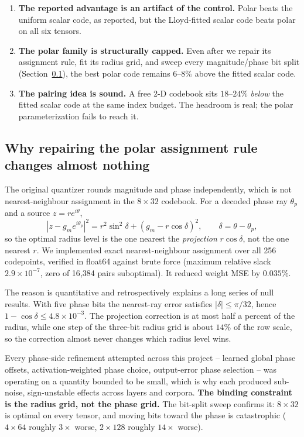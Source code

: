 \begin{enumerate}
\item \textbf{The reported advantage is an artifact of the control.} Polar beats
the uniform scalar code, as reported, but the Lloyd-fitted scalar code beats
polar on all six tensors.
\item \textbf{The polar family is structurally capped.} Even after we repair its
assignment rule, fit its radius grid, and sweep every magnitude/phase bit split
(Section~\ref{sec:polarfix}), the best polar code remains $6$--$8\%$ above the
fitted scalar code.
\item \textbf{The pairing idea is sound.} A free 2-D codebook sits $18$--$24\%$
\emph{below} the fitted scalar code at the same index budget. The headroom is
real; the polar parameterization fails to reach it.
\end{enumerate}

\subsection{Why repairing the polar assignment rule changes almost nothing}
\label{sec:polarfix}

The original quantizer rounds magnitude and phase independently, which is not
nearest-neighbour assignment in the $8\times32$ codebook. For a decoded phase
ray $\theta_p$ and a source $z=re^{i\theta}$,
\begin{equation}
 |z-g_m e^{i\theta_p}|^2 = r^2\sin^2\delta + (g_m - r\cos\delta)^2,
 \qquad \delta=\theta-\theta_p ,
\end{equation}
so the optimal radius level is the one nearest the \emph{projection}
$r\cos\delta$, not the one nearest $r$. We implemented exact nearest-neighbour
assignment over all 256 codepoints, verified in float64 against brute force
(maximum relative slack $2.9\times10^{-7}$, zero of 16{,}384 pairs suboptimal).
It reduced weight MSE by $0.035\%$.

The reason is quantitative and retrospectively explains a long series of null
results. With five phase bits the nearest-ray error satisfies
$|\delta|\le\pi/32$, hence $1-\cos\delta\le4.8\times10^{-3}$. The projection
correction is at most half a percent of the radius, while one step of the
three-bit radius grid is about $14\%$ of the row scale, so the correction almost
never changes which radius level wins.

Every phase-side refinement attempted across this project -- learned global
phase offsets, activation-weighted phase choice, output-error phase selection --
was operating on a quantity bounded to be small, which is why each produced
sub-noise, sign-unstable effects across layers and corpora. \textbf{The binding
constraint is the radius grid, not the phase grid.} The bit-split sweep confirms
it: $8\times32$ is optimal on every tensor, and moving bits toward the phase is
catastrophic ($4\times64$ roughly $3\times$ worse, $2\times128$ roughly
$14\times$ worse).

